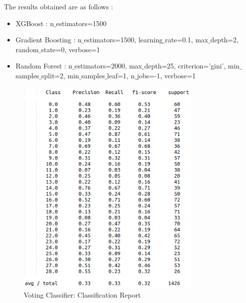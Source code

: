 \documentclass[12pt]{report}
\begin{document}
The results obtained are as follows :
\begin{itemize}
    \item XGBoost : n$\_$estimators=1500
    \item Gradient Boosting : n$\_$estimators=1500, learning$\_$rate=0.1, max$\_$depth=2, random$\_$state=0, verbose=1
    \item Random Forest : n$\_$estimators=2000, max$\_$depth=25, criterion='gini', min$\_$samples$\_$split=2, min$\_$samples$\_$leaf=1, n$\_$jobs=-1, verbose=1
\end{itemize}

\begin{figure}[H]
  \centering
  \includegraphics[width=0.8\textwidth]{Images/vote.png}
  \caption{Voting Classifier: Classification Report}
\end{figure}

\newpage
\end{document}
